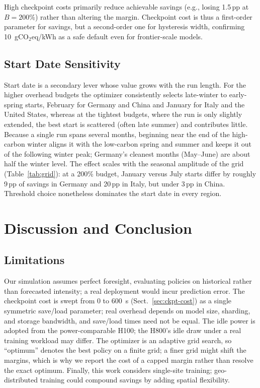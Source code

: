 \documentclass[runningheads]{llncs}
\begin{document}
High checkpoint costs primarily reduce achievable savings (e.g.,
losing 1.5\,pp at $B = 200\%$) rather than altering the margin.
Checkpoint cost is thus a first-order parameter for savings, but a
second-order one for hysteresis width, confirming 10~gCO$_2$eq/kWh as
a safe default even for frontier-scale models.

\subsection{Start Date Sensitivity}

Start date is a secondary lever whose value grows with the run
length. For the higher overhead budgets the optimizer consistently
selects late-winter to early-spring starts, February for Germany and
China and January for Italy and the United States, whereas at the
tightest budgets, where the run is only slightly extended, the best
start is scattered (often late summer) and contributes little.
Because a single run spans several months, beginning near the end of
the high-carbon winter aligns it with the low-carbon spring and
summer and keeps it out of the following winter peak; Germany's
cleanest months (May--June) are about half the winter level. The
effect scales with the seasonal amplitude of the grid
(Table~\ref{tab:grid}): at a 200\% budget, January versus July starts
differ by roughly 9\,pp of savings in Germany and 20\,pp in
Italy, but under 3\,pp in China. Threshold choice nonetheless dominates
the start date in every region.

\section{Discussion and Conclusion}

\subsection{Limitations}

Our simulation assumes perfect foresight, evaluating policies on
historical rather than forecasted intensity; a real deployment would
incur prediction error. The checkpoint cost is swept from 0 to 600~s
(Sect.~\ref{sec:ckpt-cost}) as a single symmetric save/load
parameter; real overhead depends on model size, sharding, and storage
bandwidth, and save/load times need not be equal. The idle power is
adopted from the power-comparable H100; the H800's idle draw under a
real training workload may differ.
The optimizer is an adaptive grid search, so ``optimum'' denotes the
best policy on a finite grid; a finer grid might shift the margins,
which is why we report the cost of a capped margin rather than
resolve the exact optimum. Finally, this work considers single-site
training; geo-distributed training could compound savings by adding
spatial flexibility.
\end{document}
